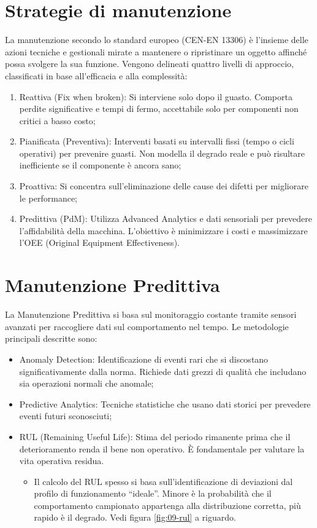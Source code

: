 %
%
\section{Strategie di manutenzione}
La manutenzione secondo lo standard europeo (CEN-EN 13306) è l'insieme delle azioni tecniche e gestionali mirate a mantenere o ripristinare un oggetto affinché possa svolgere la sua funzione. Vengono delineati quattro livelli di approccio, classificati in base all'efficacia e alla complessità:
\begin{enumerate}[
        leftmargin=2.2cm,
        label={Livello \arabic*:},
        ref={Livello \arabic*}]
    \item Reattiva (Fix when broken): Si interviene solo dopo il guasto. Comporta perdite significative e tempi di fermo, accettabile solo per componenti non critici a basso costo;
    \item Pianificata (Preventiva): Interventi basati su intervalli fissi (tempo o cicli operativi) per prevenire guasti. Non modella il degrado reale e può risultare inefficiente se il componente è ancora sano;
    \item Proattiva: Si concentra sull'eliminazione delle cause dei difetti per migliorare le performance;
    \item Predittiva (PdM): Utilizza Advanced Analytics e dati sensoriali per prevedere \\l'affidabilità della macchina. L'obiettivo è minimizzare i costi e massimizzare l'OEE (Original Equipment Effectiveness).
\end{enumerate}

%
\section{Manutenzione Predittiva}
La Manutenzione Predittiva si basa sul monitoraggio costante tramite sensori avanzati per raccogliere dati sul comportamento nel tempo. Le metodologie principali descritte sono:
\begin{itemize}
    \item Anomaly Detection: Identificazione di eventi rari che si discostano significativamente dalla norma. Richiede dati grezzi di qualità che includano sia operazioni normali che anomale;
    \item Predictive Analytics: Tecniche statistiche che usano dati storici per prevedere eventi futuri sconosciuti;
    \item RUL (Remaining Useful Life): Stima del periodo rimanente prima che il deterioramento renda il bene non operativo. È fondamentale per valutare la vita operativa residua.
          \begin{itemize}
              \item Il calcolo del RUL spesso si basa sull'identificazione di deviazioni dal profilo di funzionamento ``ideale''. Minore è la probabilità che il comportamento campionato appartenga alla distribuzione corretta, più rapido è il degrado. Vedi figura \ref{fig:09-rul} a riguardo.
          \end{itemize}
\end{itemize}


